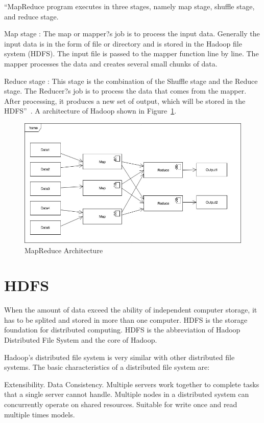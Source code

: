``MapReduce program executes in three stages, namely map stage, shuffle stage, and reduce stage.

Map stage : The map or mapper?s job is to process the input data. Generally the input data is in the form of file or directory and is stored in the Hadoop file system (HDFS). The input file is passed to the mapper function line by line. The mapper processes the data and creates several small chunks of data.

Reduce stage : This stage is the combination of the Shuffle stage and the Reduce stage. The Reducer?s job is to process the data that comes from the mapper. After processing, it produces a new set of output, which will be stored in the HDFS''~\cite{hid-sp18-508-mapreduce}.
A architecture of Hadoop shown in Figure~\ref{f:fly}.

\begin{figure}[!ht]
  \centering\includegraphics[width=\columnwidth]{images/mapReduce.jpg}
  \caption{MapReduce Architecture}\label{f:fly}
\end{figure}

\section{HDFS}
When the amount of data exceed the ability of independent computer storage, it has to be splited and stored in more than one computer. HDFS is the storage foundation for distributed computing. HDFS is the abbreviation of Hadoop Distributed File System and the core of Hadoop. 

Hadoop's distributed file system is very similar with other distributed file systems. The basic characteristics of a distributed file system are: 

Extensibility.
Data Consistency.
Multiple servers work together to complete tasks that a single server cannot handle.
Multiple nodes in a distributed system can concurrently operate on shared resources.
Suitable for write once and read multiple times models.

